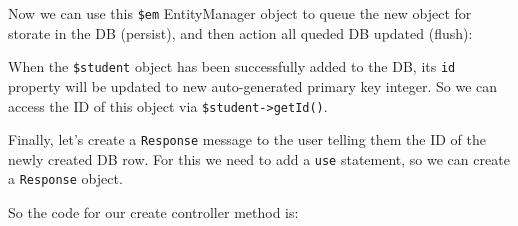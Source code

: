\documentclass[a4paperpaper,openright]{book}
\newenvironment{Shaded}{}{}
\newcommand{\FunctionTok}[1]{\textcolor[rgb]{0.02,0.16,0.49}{#1}}
\newcommand{\KeywordTok}[1]{\textcolor[rgb]{0.00,0.44,0.13}{\textbf{#1}}}
\newcommand{\NormalTok}[1]{#1}
\newcommand{\OtherTok}[1]{\textcolor[rgb]{0.00,0.44,0.13}{#1}}
\begin{document}
Now we can use this \texttt{\$em} EntityManager object to queue the new
object for storate in the DB (persist), and then action all queded DB
updated (flush):

\begin{Shaded}
\end{Shaded}

When the \texttt{\$student} object has been successfully added to the
DB, its \texttt{id} property will be updated to new auto-generated
primary key integer. So we can access the ID of this object via
\texttt{\$student-\textgreater{}getId()}.

Finally, let's create a \texttt{Response} message to the user telling
them the ID of the newly created DB row. For this we need to add a
\texttt{use} statement, so we can create a \texttt{Response} object.

So the code for our create controller method is:
\end{document}
